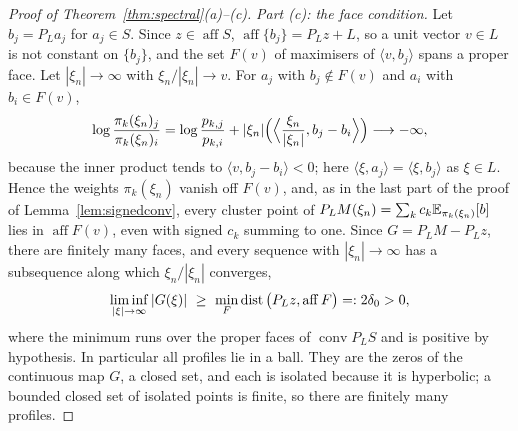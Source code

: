 \documentclass{article} %
\theoremstyle{plain}
\theoremstyle{definition}
\theoremstyle{remark}
\begin{document}
\begin{proof}[Proof of Theorem~\ref{thm:spectral}(a)--(c)]
\emph{Part (c): the face condition.} Let $b_j=P_La_j$ for $a_j\in S$. Since
$z\in\operatorname{aff}S$, $\operatorname{aff}\{b_j\}=P_Lz+L$, so a unit vector $v\in L$ is not
constant on $\{b_j\}$, and the set $F(v)$ of maximisers of $\langle v,b_j\rangle$ spans a proper
face. Let $|\xi_n|\to\infty$ with $\xi_n/|\xi_n|\to v$. For $a_j$ with $b_j\notin F(v)$ and $a_i$
with $b_i\in F(v)$,
\[
\log\frac{\pi_k(\xi_n)_j}{\pi_k(\xi_n)_i}=\log\frac{p_{k,j}}{p_{k,i}}
+|\xi_n|\Bigl(\Bigl\langle\frac{\xi_n}{|\xi_n|},b_j-b_i\Bigr\rangle\Bigr)\longrightarrow-\infty,
\]
because the inner product tends to $\langle v,b_j-b_i\rangle<0$; here $\langle\xi,a_j\rangle=
\langle\xi,b_j\rangle$ as $\xi\in L$. Hence the weights $\pi_k(\xi_n)$ vanish off $F(v)$, and, as
in the last part of the proof of Lemma~\ref{lem:signedconv}, every cluster point of
$P_LM(\xi_n)=\sum_kc_k\mathbb{E}_{\pi_k(\xi_n)}[b]$ lies in $\operatorname{aff}F(v)$, even with signed $c_k$
summing to one. Since $G=P_LM-P_Lz$, there are finitely many faces, and every sequence with
$|\xi_n|\to\infty$ has a subsequence along which $\xi_n/|\xi_n|$ converges,
\begin{equation}
\liminf_{|\xi|\to\infty}|G(\xi)|\ \ge\ \min_F\dist\big(P_Lz,\operatorname{aff}F\big)=:2\delta_0>0 ,
\label{eq:pf:spec:escape}
\end{equation}
where the minimum runs over the proper faces of $\operatorname{conv}P_LS$ and is positive by
hypothesis. In particular all profiles lie in a ball. They are the zeros of the continuous map
$G$, a closed set, and each is isolated because it is hyperbolic; a bounded closed set of isolated
points is finite, so there are finitely many profiles.


\end{proof}
\end{document}
